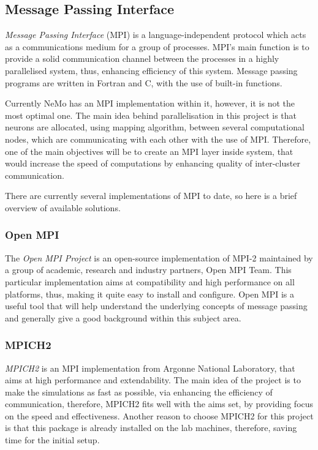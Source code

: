 \subsection{Message Passing Interface}

\emph{Message Passing Interface} (MPI) is a language-independent protocol which acts as a communications medium for a group of processes.\cite{mpi} MPI's main function is to provide
a solid communication channel between the processes in a highly parallelised system, thus, enhancing efficiency of this system. Message passing programs are written in Fortran and 
C, with the use of built-in functions.

Currently NeMo has an MPI implementation within it, however, it is not the most optimal one. The main idea behind parallelisation in this project is that neurons are allocated, 
using mapping algorithm, between several computational nodes, which are communicating with each other with the use of MPI. Therefore, one of the main objectives will be to 
create an MPI layer inside system, that would increase the speed of computations by enhancing quality of inter-cluster communication.

There are currently several implementations of MPI to date, so here is a brief overview of available solutions.

\subsubsection{Open MPI}

The \emph{Open MPI Project} is an open-source implementation of MPI-2 maintained by a group of academic, research and industry partners, Open MPI Team.\cite{RichardL.Graham2005} This particular 
implementation aims at compatibility and high performance on all platforms, thus, making it quite easy to install and configure. Open MPI is a useful tool that will help understand 
the underlying concepts of message passing and generally give a good background within this subject area.

\subsubsection{MPICH2}

\emph{MPICH2} is an MPI implementation from Argonne National Laboratory, that aims at high performance and extendability.\cite{W.Gropp1999} The main idea of the project is to make the simulations as
fast as possible, via enhancing the efficiency of communication, therefore, MPICH2 fits well with the aims set, by providing focus on the speed and effectiveness. Another reason to choose 
MPICH2 for this project is that this package is already installed on the lab machines, therefore, saving time for the initial setup.\cite{W.Gropp1999a}


